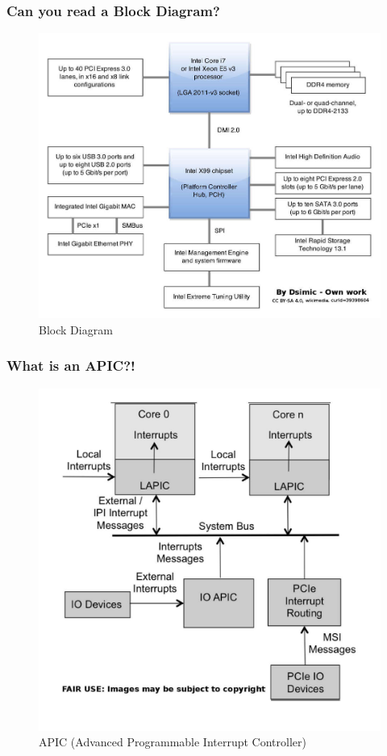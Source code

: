 \documentclass[xcolor=table, notheorems, hyperref={pdfpagelabels=false}]{beamer}
\begin{document}
\begin{frame}
\frametitle{Can you read a Block Diagram?}
\begin{figure}
\includegraphics[width=0.70\linewidth]{os00-x99-chipset-block-diagram}
\caption{Block Diagram}
\end{figure}
\end{frame}

\begin{frame}
\frametitle{What is an APIC?!}
\begin{figure}
\includegraphics[width=0.60\linewidth]{os00-xapic}
\caption{APIC (Advanced Programmable Interrupt Controller)}
\end{figure}
\end{frame}
\end{document}
